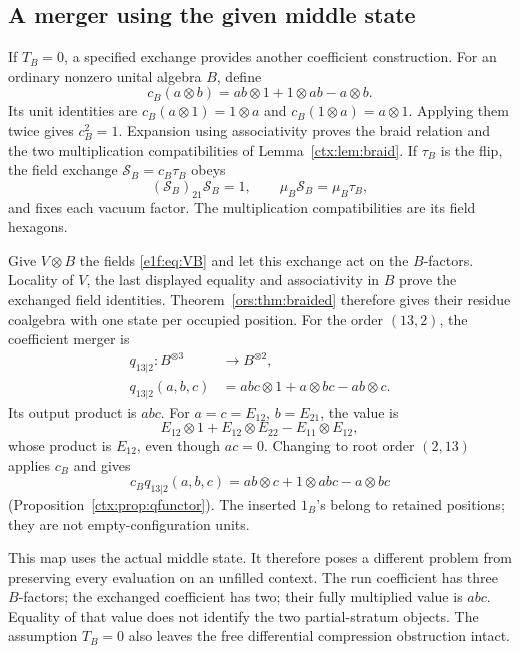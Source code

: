 \subsection{A merger using the given middle state}

If\label{e1f:def:middle-state-exchange} \(T_B=0\), a specified exchange provides another
coefficient construction. For an ordinary nonzero unital
algebra \(B\), define
\[
 c_B(a\otimes b)=ab\otimes1+1\otimes ab-a\otimes b.
\]
Its unit identities are
\(c_B(a\otimes1)=1\otimes a\) and
\(c_B(1\otimes a)=a\otimes1\). Applying them twice gives
\(c_B^2=1\). Expansion using associativity proves the
braid relation and the two multiplication compatibilities
of Lemma~\ref{ctx:lem:braid}. If \(\tau_B\) is the flip,
the field exchange \(\mathcal S_B=c_B\tau_B\) obeys
\[
 (\mathcal S_B)_{21}\mathcal S_B=1,
 \qquad \mu_B\mathcal S_B=\mu_B\tau_B,
\]
and fixes each vacuum factor. The multiplication
compatibilities are its field hexagons.

Give \(V\otimes B\) the fields \eqref{e1f:eq:VB} and
let this exchange act on the \(B\)-factors. Locality of
\(V\), the last displayed equality and associativity in
\(B\) prove the exchanged field identities. Theorem~\ref{ors:thm:braided}
therefore gives their residue coalgebra with one state per
occupied position.
For the order \((13,2)\), the coefficient merger is
\begin{equation}\label{e1f:eq:contextual-outer}
 \begin{aligned}
 q_{13|2}:B^{\otimes3}&\longrightarrow B^{\otimes2},\\
 q_{13|2}(a,b,c)&=abc\otimes1+a\otimes bc-ab\otimes c.
 \end{aligned}
\end{equation}
Its output product is \(abc\). For
\(a=c=E_{12}\), \(b=E_{21}\), the value is
\[
 E_{12}\otimes1+E_{12}\otimes E_{22}
                         -E_{11}\otimes E_{12},
\]
whose product is \(E_{12}\), even though \(ac=0\).
Changing to root order \((2,13)\) applies \(c_B\) and gives
\[
 c_Bq_{13|2}(a,b,c)=ab\otimes c+1\otimes abc-a\otimes bc
\]
(Proposition~\ref{ctx:prop:qfunctor}). The inserted
\(1_B\)'s belong to retained positions; they are not
empty-configuration units.

This map uses the actual middle state. It therefore poses
a different problem from preserving every evaluation on
an unfilled context. The run coefficient has three
\(B\)-factors; the exchanged coefficient has two; their
fully multiplied value is \(abc\). Equality of that
value does not identify the two partial-stratum objects.
The assumption \(T_B=0\) also leaves the free differential
compression obstruction intact.

